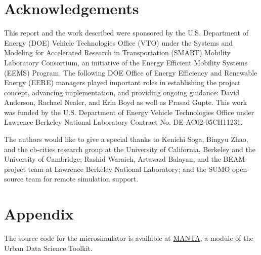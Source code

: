 \documentclass[final]{IEEEtran}
\begin{document}
\section{Acknowledgements}

This report and the work described were sponsored by the U.S. Department of Energy (DOE) Vehicle Technologies Office (VTO) under the Systems and Modeling for Accelerated Research in Transportation (SMART) Mobility Laboratory Consortium, an initiative of the Energy Efficient Mobility Systems (EEMS) Program. The following DOE Office of Energy Efficiency and Renewable Energy (EERE) managers played important roles in establishing the project concept, advancing implementation, and providing ongoing guidance: David Anderson, Rachael Nealer, and Erin Boyd as well as Prasad Gupte. This work was funded by the U.S. Department of Energy Vehicle Technologies Office under Lawrence Berkeley National Laboratory Contract No. DE-AC02-05CH11231.

The authors would like to give a special thanks to Kenichi Soga, Bingyu Zhao, and the cb-cities research group at the University of California, Berkeley and the University of Cambridge; Rashid Waraich, Artavazd Balayan, and the BEAM project team at Lawrence Berkeley National Laboratory; and the SUMO open-source team for remote simulation support.

\section{Appendix}
The source code for the microsimulator is available at \href{https://github.com/UDST/manta}{MANTA}, a module of the Urban Data Science Toolkit.




\end{document}
